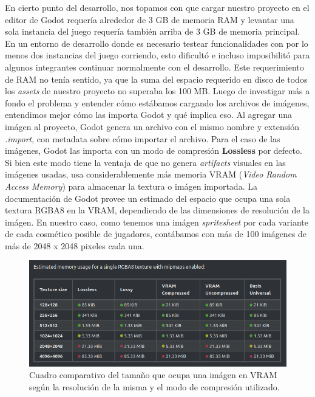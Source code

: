En cierto punto del desarrollo, nos topamos con que cargar nuestro proyecto en el editor de Godot
requería alrededor de 3 GB de memoria RAM y levantar una sola instancia del juego requería también
arriba de 3 GB de memoria principal. En un entorno de desarrollo donde es necesario testear
funcionalidades con por lo menos dos instancias del juego corriendo, esto dificultó e incluso
imposibilitó para algunos integrantes continuar normalmente con el desarrollo. Este requerimiento
de RAM no tenía sentido, ya que la suma del espacio requerido en disco de todos los 
\textit{assets} de nuestro proyecto no superaba los 100 MB.
Luego de investigar más a fondo el problema y entender cómo estábamos cargando los archivos de imágenes,
entendimos mejor cómo las importa Godot y qué implica eso.
Al agregar una imágen al proyecto, Godot genera un archivo con el mismo nombre y extensión 
\textit{.import}, con metadata sobre cómo importar el archivo. Para el caso de las imágenes, 
Godot las importa con un modo de compresión \textbf{Lossless} por defecto. Si bien este modo
tiene la ventaja de que no genera \textit{artifacts} visuales en las imágenes usadas, usa 
considerablemente más memoria VRAM (\textit{Video Random Access Memory}) para almacenar la textura o
imágen importada. La documentación de Godot provee un estimado del espacio que ocupa una sola textura
RGBA8 en la VRAM, dependiendo de las dimensiones de resolución de la imágen. En nuestro caso, como
tenemos una imágen \textit{spritesheet} por cada variante de cada cosmético posible de jugadores,
contábamos con más de 100 imágenes de más de 2048 x 2048 pixeles cada una. 

\begin{figure}[htbp]
    \centering
    \includegraphics[width=1.0\textwidth]{../assets/godot-docs-images.png}
    \caption{Cuadro comparativo del tamaño que ocupa una imágen en VRAM según la resolución
             de la misma y el modo de compresión utilizado.}
\end{figure}

